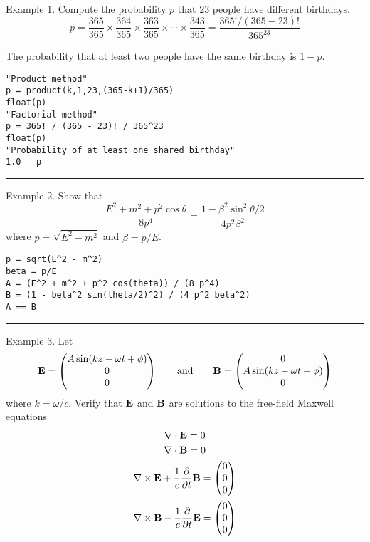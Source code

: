 \documentclass[12pt]{article}
\begin{document}
\noindent
Example 1. Compute the probability $p$ that 23 people have different birthdays.
$$
p=\frac{365}{365}\times\frac{364}{365}\times\frac{363}{365}\times\cdots
\times\frac{343}{365}=\frac{365!/(365-23)!}{365^{23}}
$$

\noindent
The probability that at least two people have the same birthday is $1-p$.

\begin{verbatim}
"Product method"
p = product(k,1,23,(365-k+1)/365)
float(p)
"Factorial method"
p = 365! / (365 - 23)! / 365^23
float(p)
"Probability of at least one shared birthday"
1.0 - p
\end{verbatim}

\bigskip
\hrule

\bigskip
\noindent
Example 2. Show that
$$
\frac{E^2+m^2+p^2\cos\theta}{8p^4}
=\frac{1-\beta^2\sin^2\theta/2}{4p^2\beta^2}
$$
where $p=\sqrt{E^2-m^2}$ and $\beta=p/E$.

\begin{verbatim}
p = sqrt(E^2 - m^2)
beta = p/E
A = (E^2 + m^2 + p^2 cos(theta)) / (8 p^4)
B = (1 - beta^2 sin(theta/2)^2) / (4 p^2 beta^2)
A == B
\end{verbatim}

\bigskip
\hrule

\bigskip
\noindent
Example 3. Let
$$
{\bf E}=
\begin{pmatrix}
A\sin(kz-\omega t+\phi)\\0\\0
\end{pmatrix}
\qquad\text{and}\qquad
{\bf B}=
\begin{pmatrix}
0\\A\sin(kz-\omega t+\phi)\\0
\end{pmatrix}
$$
where $k=\omega/c$.
Verify that $\bf E$ and $\bf B$ are solutions to the free-field Maxwell equations
\begin{gather*}
\nabla\cdot{\bf E}=0\\
\nabla\cdot{\bf B}=0\\
\nabla\times{\bf E}+\frac{1}{c}\frac{\partial}{\partial t}{\bf B}=\begin{pmatrix}0\\0\\0\end{pmatrix}\\
\nabla\times{\bf B}-\frac{1}{c}\frac{\partial}{\partial t}{\bf E}=\begin{pmatrix}0\\0\\0\end{pmatrix}
\end{gather*}
\end{document}
